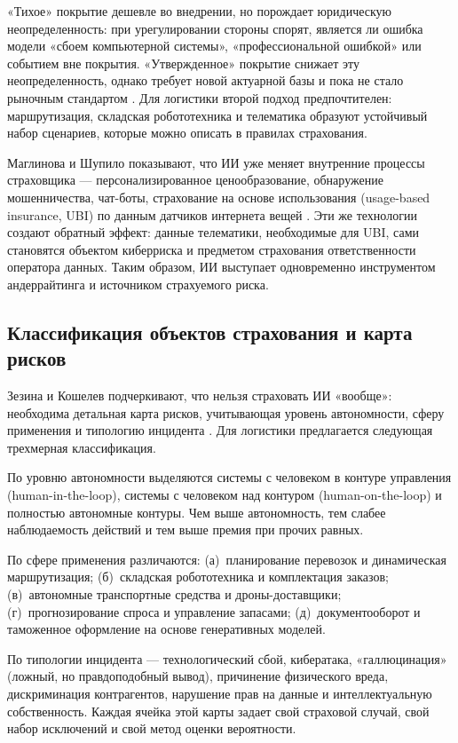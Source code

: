 \documentclass[a4paper,14pt]{extarticle}
\begin{document}
«Тихое» покрытие дешевле во внедрении, но порождает юридическую неопределенность: при урегулировании стороны спорят, является ли ошибка модели «сбоем компьютерной системы», «профессиональной ошибкой» или событием вне покрытия. «Утвержденное» покрытие снижает эту неопределенность, однако требует новой актуарной базы и пока не стало рыночным стандартом \cite{zezina}. Для логистики второй подход предпочтителен: маршрутизация, складская робототехника и телематика образуют устойчивый набор сценариев, которые можно описать в правилах страхования.

Маглинова и Шупило показывают, что ИИ уже меняет внутренние процессы страховщика --- персонализированное ценообразование, обнаружение мошенничества, чат-боты, страхование на основе использования (usage-based insurance, UBI) по данным датчиков интернета вещей \cite{maglinova}. Эти же технологии создают обратный эффект: данные телематики, необходимые для UBI, сами становятся объектом киберриска и предметом страхования ответственности оператора данных. Таким образом, ИИ выступает одновременно инструментом андеррайтинга и источником страхуемого риска.

\subsection{Классификация объектов страхования и карта рисков}

Зезина и Кошелев подчеркивают, что нельзя страховать ИИ «вообще»: необходима детальная карта рисков, учитывающая уровень автономности, сферу применения и типологию инцидента \cite{zezina}. Для логистики предлагается следующая трехмерная классификация.

По уровню автономности выделяются системы с человеком в контуре управления (human-in-the-loop), системы с человеком над контуром (human-on-the-loop) и полностью автономные контуры. Чем выше автономность, тем слабее наблюдаемость действий и тем выше премия при прочих равных.

По сфере применения различаются: (а)~планирование перевозок и динамическая маршрутизация; (б)~складская робототехника и комплектация заказов; (в)~автономные транспортные средства и дроны-доставщики; (г)~прогнозирование спроса и управление запасами; (д)~документооборот и таможенное оформление на основе генеративных моделей.

По типологии инцидента --- технологический сбой, кибератака, «галлюцинация» (ложный, но правдоподобный вывод), причинение физического вреда, дискриминация контрагентов, нарушение прав на данные и интеллектуальную собственность. Каждая ячейка этой карты задает свой страховой случай, свой набор исключений и свой метод оценки вероятности.
\end{document}

